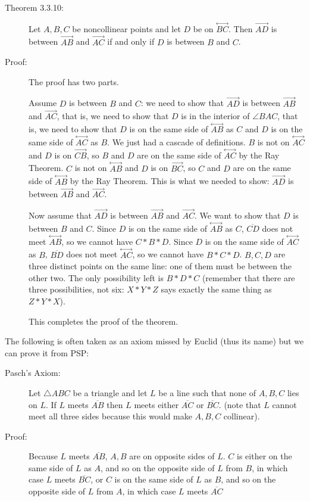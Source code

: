 \documentclass[12pt]{article}
\newcommand\Line[1]{\overset{\leftrightarrow}{#1}}
\begin{document}
\begin{description}

\item[Theorem 3.3.10:]  Let $A,B,C$ be noncollinear points and let $D$ be on $\Line{BC}$.  Then $\overrightarrow{AD}$ is between $\overrightarrow{AB}$ and $\overrightarrow{AC}$ if and only if $D$ is between $B$ and $C$.

\item[Proof:]  The proof has two parts.

Assume $D$ is between $B$ and $C$:  we need to show that $\overrightarrow{AD}$ is between $\overrightarrow{AB}$ and $\overrightarrow{AC}$, that is, we need to show that $D$ is in the interior of $\angle BAC$, that is, we need to show that $D$ is on the same side of $\Line{AB}$ as $C$ and $D$ is on the same side of $\Line{AC}$ as $B$.  We just had a cascade of definitions.  $B$ is not on $\Line{AC}$ and $D$ is on $\overrightarrow{CB}$, so $B$ and $D$ are on the same side of $\Line{AC}$ by the Ray Theorem.   $C$ is not on $\Line{AB}$ and $D$ is on $\overrightarrow{BC}$, so $C$ and $D$ are on the same side of $\Line{AB}$ by the Ray Theorem.   This is what we needed to show:   $\overrightarrow{AD}$ is between $\overrightarrow{AB}$ and $\overrightarrow{AC}$.

Now assume that  $\overrightarrow{AD}$ is between $\overrightarrow{AB}$ and $\overrightarrow{AC}$.  We want to show that $D$ is between $B$ and $C$.  Since
$D$ is on the same side of $\Line{AB}$ as $C$, $\overline{CD}$ does not meet $\Line{AB}$, so we cannot have $C*B*D$.  Since
$D$ is on the same side of $\Line{AC}$ as $B$, $\overline{BD}$ does not meet $\Line{AC}$, so we cannot have $B*C*D$.  $B,C,D$ are three distinct points on the same
line:  one of them must be between the other two.  The only possibility left is $B*D*C$ (remember that there are three possibilities, not six:  $X*Y*Z$ says exactly the same thing as $Z*Y*X$).

This completes the proof of the theorem.

\end{description}

The following is often taken as an axiom missed by Euclid (thus its name) but we can prove it from PSP:

\begin{description}

\item[Pasch's Axiom:]  Let $\triangle ABC$ be a triangle and let $L$ be a line such that none of $A,B,C$ lies on $L$.
If $L$ meets $\overline{AB}$ then $L$ meets either $\overline{AC}$ or $\overline{BC}$.  (note that $L$ cannot meet all three sides because this would make $A,B,C$ collinear).

\item[Proof:]  Because $L$ meets $\overline{AB}$, $A,B$ are on opposite sides of $L$.  $C$ is either on the same side of $L$ as $A$, and so on the opposite side of $L$ from $B$, in which case $L$ meets $\overline{BC}$, or $C$ is on the same side of $L$ as $B$, and so on the opposite side of $L$ from $A$, in which case $L$ meets $\overline{AC}$

\end{description}
\end{document}
